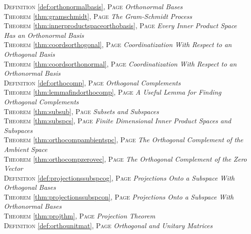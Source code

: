 \begin{multicols}{2}
{\textsc{Definition} \ref{def:orthonormalbasis}, \textsc{Page} \pageref{def:orthonormalbasis} \textit{Orthonormal Bases} \\
\textsc{Theorem} \ref{thm:gramschmidt}, \textsc{Page} \pageref{thm:gramschmidt} \textit{The Gram-Schmidt Process} \\
\textsc{Theorem} \ref{thm:innerproductspaceorthobasis}, \textsc{Page} \pageref{thm:innerproductspaceorthobasis} \textit{Every Inner Product Space Has an Orthonormal Basis} \\
\textsc{Theorem} \ref{thm:coordsorthogonal}, \textsc{Page} \pageref{thm:coordsorthogonal} \textit{Coordinatization With Respect to an Orthogonal Basis} \\
\textsc{Theorem} \ref{thm:coordsorthonormal}, \textsc{Page} \pageref{thm:coordsorthonormal} \textit{Coordinatization With Respect to an Orthonormal Basis} \\
\textsc{Definition} \ref{def:orthocomp}, \textsc{Page} \pageref{def:orthocomp} \textit{Orthogonal Complements} \\
\textsc{Theorem} \ref{thm:lemmafindorthocomp}, \textsc{Page} \pageref{thm:lemmafindorthocomp} \textit{A Useful Lemma for Finding Orthogonal Complements} \\
\textsc{Theorem} \ref{thm:subsub}, \textsc{Page} \pageref{thm:subsub} \textit{Subsets and Subspaces} \\
\textsc{Theorem} \ref{thm:subspcs}, \textsc{Page} \pageref{thm:subspcs} \textit{Finite Dimensional Inner Product Spaces and Subspaces} \\
\textsc{Theorem} \ref{thm:orthocompambientspc}, \textsc{Page} \pageref{thm:orthocompambientspc} \textit{The Orthogonal Complement of the Ambient Space} \\
\textsc{Theorem} \ref{thm:orthocompzerovec}, \textsc{Page} \pageref{thm:orthocompzerovec} \textit{The Orthogonal Complement of the Zero Vector} \\
\textsc{Definition} \ref{def:projectionssubspcog}, \textsc{Page} \pageref{def:projectionssubspcog} \textit{Projections Onto a Subspace With Orthogonal Bases} \\
\textsc{Theorem} \ref{thm:projectionssubspcon}, \textsc{Page} \pageref{thm:projectionssubspcon} \textit{Projections Onto a Subspace With Orthonormal Bases} \\
\textsc{Theorem} \ref{thm:projthm}, \textsc{Page} \pageref{thm:projthm} \textit{Projection Theorem} \\
\textsc{Definition} \ref{def:orthounitmat}, \textsc{Page} \pageref{def:orthounitmat} \textit{Orthogonal and Unitary Matrices} \\
}
\end{multicols}
